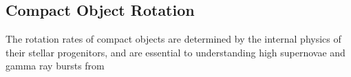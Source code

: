 {\color{orange}

\subsection{Compact Object Rotation}

The rotation rates of compact objects are determined by the internal physics of their stellar progenitors, and are essential to understanding high supernovae and gamma ray bursts from 

}